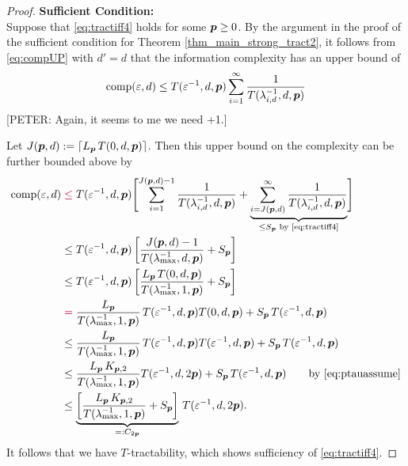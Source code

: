 \documentclass[11pt,a4paper]{article}
\newcommand{\peter}[1]{\begingroup\color{purple}#1\endgroup}
\begin{document}
\begin{proof}
    \textbf{Sufficient Condition:}\\
Suppose that \eqref{eq:tractiff4} holds for some $\boldsymbol{p} \ge 0$. By the argument in the proof of the sufficient condition for Theorem \ref{thm_main_strong_tract2}, it follows from \eqref{eq:compUP} with $d'=d$ that the \peter{information} complexity has an upper bound of
\begin{equation*}
	 \operatorname{comp}(\varepsilon,d) \le  T(\varepsilon^{-1},d,\boldsymbol{p}) \sum_{i=1}^\infty \frac{1}{T(\lambda_{i, d}^{-1},d,\boldsymbol{p})}
\end{equation*}
\peter{[PETER: Again, it seems to me we need +1.]}

Let $J(\boldsymbol{p},d): = \lceil L_{\boldsymbol{p}}\, T(0,d,\boldsymbol{p})\rceil$.  Then this upper bound on the complexity can be further bounded above by
\begin{align*}
       \comp(\varepsilon,d)
       & \peter{\le} T(\varepsilon^{-1},d,\vp) \Biggl [ \sum_{i=1}^{J(\vp,d) -1} \frac{1}{T(\lambda_{i, d}^{-1},d,\vp)}
       + \underbrace{\sum_{i=J(\vp,d)}^\infty \frac{1}{T(\lambda_{i, d}^{-1},d,\vp)}}_{\le S_{\vp} \text{ by \eqref{eq:tractiff4}}} \Biggr ] \\
       & \le T(\varepsilon^{-1},d,\vp)\left[ \frac{J(\vp,d)-1}{T(\lambda_{\max}^{-1},d,\vp)} + S_{\vp}\right]
        \\
       & \le T(\varepsilon^{-1},d,\vp)\left[\frac{L_{\vp}\, T(0,d,\vp)}{T(\lambda_{\max}^{-1},1,\vp)} + S_{\vp}\right] \\
       & \peter{=}\frac{L_{\vp}}{T(\lambda_{\max}^{-1},1,\vp)} \,T(\varepsilon^{-1},d,\vp) T(0,d,\vp) + S_{\vp}\, T(\varepsilon^{-1},d,\vp)\\
       & \le\frac{L_{\vp}}{T(\lambda_{\max}^{-1},1,\vp)} \,T(\varepsilon^{-1},d,\vp) T(\varepsilon^{-1},d,\vp) + S_{\vp}\, T(\varepsilon^{-1},d,\vp)\\
       & \le \frac{L_{\vp}\,K_{\vp,2}}{T(\lambda_{\max}^{-1},1,\vp)}  T(\varepsilon^{-1},d,2\vp)  + S_{\vp}\, T(\varepsilon^{-1},d,\vp)  \qquad \text{by \eqref{eq:ptauassume}}\\
       & \le \underbrace{\left[\frac{L_{\vp}\,K_{\vp,2}}{T(\lambda_{\max}^{-1},1,\vp)} + S_{\vp}\right]}_{=:C_{2\vp}} \,T(\varepsilon^{-1},d,2\vp).
\end{align*}
It follows that we have $T$-tractability, which shows sufficiency of \eqref{eq:tractiff4}.

\bigskip


\end{proof}
\end{document}

